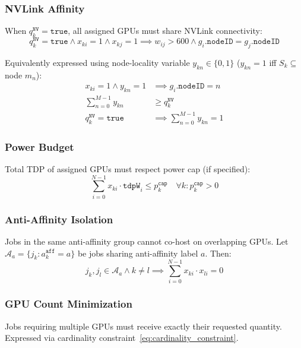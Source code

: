 \documentclass[11pt, twoside]{article}
\begin{document}
\subsubsection{NVLink Affinity}
When $q_k^{\texttt{NV}} = \texttt{true}$, all assigned GPUs must share NVLink connectivity:
\begin{equation}
q_k^{\texttt{NV}} = \texttt{true} \land x_{ki}=1 \land x_{kj}=1 \implies w_{ij} > 600 \land g_i.\texttt{nodeID} = g_j.\texttt{nodeID}
\label{eq:nvlink_constraint}
\end{equation}

Equivalently expressed using node-locality variable $y_{kn} \in \{0,1\}$ ($y_{kn}=1$ iff $S_k \subseteq$ node $m_n$):
\begin{align}
x_{ki} = 1 \land y_{kn} = 1 &\implies g_i.\texttt{nodeID} = n \\
\sum_{n=0}^{M-1} y_{kn} &\geq q_k^{\texttt{NV}} \\
q_k^{\texttt{NV}} = \texttt{true} &\implies \sum_{n=0}^{M-1} y_{kn} = 1
\label{eq:nvlink_locality}
\end{align}

\subsubsection{Power Budget}
Total TDP of assigned GPUs must respect power cap (if specified):
\begin{equation}
\sum_{i=0}^{N-1} x_{ki} \cdot \texttt{tdpW}_i \leq p_k^{\texttt{cap}} \quad \forall k : p_k^{\texttt{cap}} > 0
\label{eq:power_constraint}
\end{equation}

\subsubsection{Anti-Affinity Isolation}
Jobs in the same anti-affinity group cannot co-host on overlapping GPUs. Let $\mathcal{A}_a = \{j_k : a_k^{\texttt{aff}} = a\}$ be jobs sharing anti-affinity label $a$. Then:
\begin{equation}
j_k, j_l \in \mathcal{A}_a \land k \neq l \implies \sum_{i=0}^{N-1} x_{ki} \cdot x_{li} = 0
\label{eq:anti_affinity}
\end{equation}

\subsubsection{GPU Count Minimization}
Jobs requiring multiple GPUs must receive exactly their requested quantity. Expressed via cardinality constraint~\eqref{eq:cardinality_constraint}.
\end{document}
